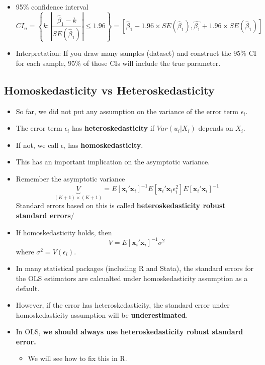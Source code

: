 \documentclass[]{book}
\providecommand{\tightlist}{%
  \setlength{\itemsep}{0pt}\setlength{\parskip}{0pt}}
\begin{document}
\begin{itemize}
\tightlist
\item
  95\% confidence interval \[
  CI_{n}  =\left\{ k:|\frac{\hat{\beta}_{1}-k}{SE(\hat{\beta}_{1})}|\leq1.96\right\} 
  =\left[\hat{\beta}_{1}-1.96\times SE(\hat{\beta}_{1}),\hat{\beta_{1}}+1.96\times SE(\hat{\beta}_{1})\right]
  \]
\item
  Interpretation: If you draw many samples (dataset) and construct the
  95\% CI for each sample, 95\% of those CIs will include the true
  parameter.
\end{itemize}

\subsection{Homoskedasticity vs
Heteroskedasticity}\label{homoskedasticity-vs-heteroskedasticity}

\begin{itemize}
\tightlist
\item
  So far, we did not put any assumption on the variance of the error
  term \(\epsilon_i\).
\item
  The error term \(\epsilon_{i}\) has \textbf{heteroskedasticity} if
  \(Var(u_{i}|X_{i})\) depends on \(X_{i}\).
\item
  If not, we call \(\epsilon_{i}\) has \textbf{homoskedasticity}.
\item
  This has an important implication on the asymptotic variance.
\item
  Remember the asymptotic variance \[
  \underbrace{V}_{(K+1)\times(K+1)}
   = E[\mathbf{x}_{i}'\mathbf{x}_{i}]^{-1}E[\mathbf{x}_{i}'\mathbf{x}_{i}\epsilon_{i}^{2}]E[\mathbf{x}_{i}'\mathbf{x}_{i}]^{-1}
  \] Standard errors based on this is called \textbf{heteroskedasticity
  robust standard errors}/
\item
  If homoskedasticity holds, then \[
  V = E[\mathbf{x}_{i}'\mathbf{x}_{i}]^{-1}\sigma^{2}
  \] where \(\sigma^2 = V(\epsilon_i)\).
\item
  In many statistical packages (including R and Stata), the standard
  errors for the OLS estimators are calcualted under homoskedasticity
  assumption as a default.
\item
  However, if the error has heteroskedasticity, the standard error under
  homoskedasticity assumption will be \textbf{underestimated}.
\item
  In OLS, \textbf{we should always use heteroskedasticity robust
  standard error.}

  \begin{itemize}
  \tightlist
  \item
    We will see how to fix this in R.
  \end{itemize}
\end{itemize}
\end{document}
